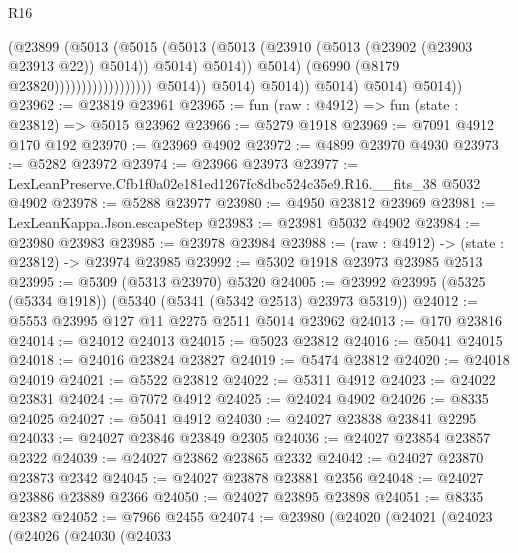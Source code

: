 \begin{lexlean}{R16}
\begin{coremodule}
                                                    (@23899
                                                      (@5013
                                                        (@5015
                                                          (@5013
                                                            (@5013
                                                              (@23910
                                                                (@5013
                                                                  (@23902 (@23903 @23913 @22))
                                                                  @5014))
                                                              @5014)
                                                            @5014))
                                                        @5014)
                                                      (@6990 (@8179 @23820))))))))))))))))))
                      @5014))
                  @5014)
                @5014))
            @5014)
          @5014)
        @5014))
@23962 := @23819 @23961
@23965 := fun (raw : @4912) => fun (state : @23812) => @5015 @23962
@23966 := @5279 @1918
@23969 := @7091 @4912 @170 @192
@23970 := @23969 @4902
@23972 := @4899 @23970 @4930
@23973 := @5282 @23972
@23974 := @23966 @23973
@23977 := LexLeanPreserve.Cfb1f0a02e181ed1267fc8dbc524c35e9.R16.__fits_38 @5032 @4902
@23978 := @5288 @23977
@23980 := @4950 @23812 @23969
@23981 := LexLeanKappa.Json.escapeStep
@23983 := @23981 @5032 @4902
@23984 := @23980 @23983
@23985 := @23978 @23984
@23988 := (raw : @4912) -> (state : @23812) -> @23974 @23985
@23992 := @5302 @1918 @23973 @23985 @2513
@23995 := @5309 (@5313 @23970) @5320
@24005 := @23992 @23995 (@5325 (@5334 @1918)) (@5340 (@5341 (@5342 @2513) @23973 @5319))
@24012 := @5553 @23995 @127 @11 @2275 @2511 @5014 @23962
@24013 := @170 @23816
@24014 := @24012 @24013
@24015 := @5023 @23812
@24016 := @5041 @24015
@24018 := @24016 @23824 @23827
@24019 := @5474 @23812
@24020 := @24018 @24019
@24021 := @5522 @23812
@24022 := @5311 @4912
@24023 := @24022 @23831
@24024 := @7072 @4912
@24025 := @24024 @4902
@24026 := @8335 @24025
@24027 := @5041 @4912
@24030 := @24027 @23838 @23841 @2295
@24033 := @24027 @23846 @23849 @2305
@24036 := @24027 @23854 @23857 @2322
@24039 := @24027 @23862 @23865 @2332
@24042 := @24027 @23870 @23873 @2342
@24045 := @24027 @23878 @23881 @2356
@24048 := @24027 @23886 @23889 @2366
@24050 := @24027 @23895 @23898
@24051 := @8335 @2382
@24052 := @7966 @2455
@24074 := @23980
    (@24020
      (@24021
        (@24023
          (@24026
            (@24030
              (@24033

\end{coremodule}
\end{lexlean}
